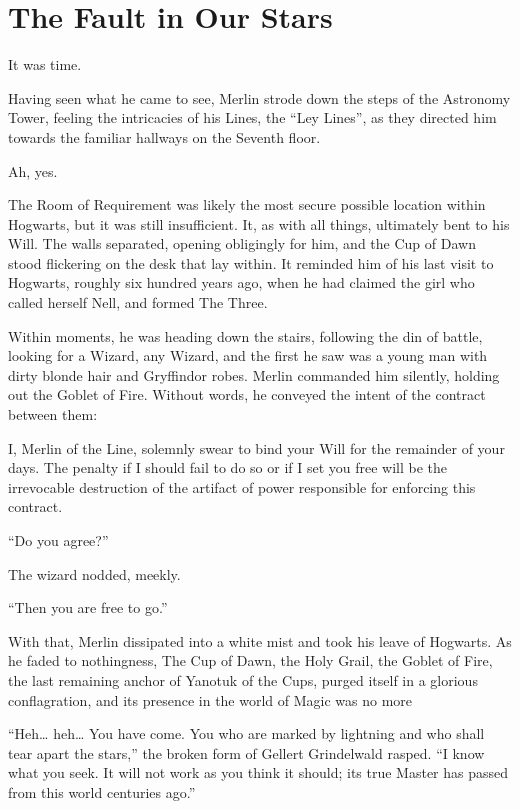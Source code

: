 \chapter{The Fault in Our Stars}


It was time.

Having seen what he came to see, Merlin strode down the steps of the Astronomy Tower, feeling the intricacies of his Lines, the “Ley Lines”, as they directed him towards the familiar hallways on the Seventh floor.

Ah, yes.

The Room of Requirement was likely the most secure possible location within Hogwarts, but it was still insufficient. It, as with all things, ultimately bent to his Will. The walls separated, opening obligingly for him, and the Cup of Dawn stood flickering on the desk that lay within. It reminded him of his last visit to Hogwarts, roughly six hundred years ago, when he had claimed the girl who called herself Nell, and formed The Three.

Within moments, he was heading down the stairs, following the din of battle, looking for a Wizard, any Wizard, and the first he saw was a young man with dirty blonde hair and Gryffindor robes. Merlin commanded him silently, holding out the Goblet of Fire. Without words, he conveyed the intent of the contract between them:

I, Merlin of the Line, solemnly swear to bind your Will for the remainder of your days. The penalty if I should fail to do so or if I set you free will be the irrevocable destruction of the artifact of power responsible for enforcing this contract. 

“Do you agree?”

The wizard nodded, meekly.

“Then you are free to go.”

With that, Merlin dissipated into a white mist and took his leave of Hogwarts. As he faded to nothingness, The Cup of Dawn, the Holy Grail, the Goblet of Fire, the last remaining anchor of Yanotuk of the Cups, purged itself in a glorious conflagration, and its presence in the world of Magic was no more
\simpleline


“Heh… heh…  You have come. You who are marked by lightning and who shall tear apart the stars,” the broken form of Gellert Grindelwald rasped. “I know what you seek. It will not work as you think it should; its true Master has passed from this world centuries ago.”


